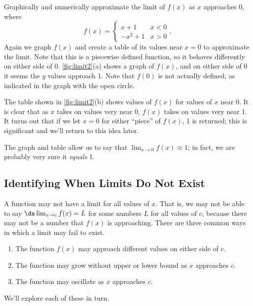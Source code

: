\begin{example}\label{ex_limit2}
Graphically and numerically approximate the limit of $f(x)$ as $x$ approaches 0, where\vspace{-.3\baselineskip}
\[f(x) = \begin{cases} x+1 & x< 0 \\ -x^2+1 & x > 0 \end{cases}.\]
\solution
Again we graph $f(x)$ and create a table of its values near $x=0$ to approximate the limit. Note that this is a piecewise defined function, so it behaves differently on either side of 0. \autoref{fig:limit2}(a) shows a graph of $f(x)$, and on either side of 0 it seems the $y$ values approach 1. Note that $f(0)$ is not actually defined, as indicated in the graph with the open circle.

The table shown in \autoref{fig:limit2}(b) shows values of $f(x)$ for values of $x$ near 0. It is clear that as $x$ takes on values very near 0, $f(x)$ takes on values very near 1. It turns out that if we let $x=0$ for either ``piece'' of $f(x)$, 1 is returned; this is significant and we'll return to this idea later.

The graph and table allow us to say that $\lim_{x\to 0}f(x) \approx 1$; in fact, we are probably very sure it \emph{equals} 1.
\end{example}

\subsection{Identifying When Limits Do Not Exist}

A function may not have a limit for all values of $x$. That is, we may not be able to say $\ds\lim_{x\to c}f(x)=L$ for some numbers $L$ for all values of $c$, because there may not be a number that $f(x)$ is approaching. There are three common ways in which a limit may fail to exist. 
\begin{enumerate}
	\item	The function $f(x)$ may approach different values on either side of $c$.
	\item	The function may grow without upper or lower bound as $x$ approaches $c$.
	\item	The function may oscillate as $x$ approaches $c$.
\end{enumerate}

We'll explore each of these in turn.\bigskip

